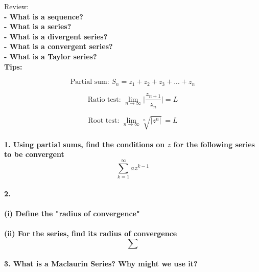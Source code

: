\documentclass{article}
\author{Alex Hiller}
\title{}
\newcommand{\begeq}[1]{\begin{equation} \label{eq:#1}}
\newcommand{\eeq}{\end{equation}}
\newcommand{\question}[1]{\textbf{#1} \\}   %
\begin{document}

Review: \\
\question{- What is a sequence?           \\
          - What is a series?             \\
          - What is a divergent series?   \\
          - What is a convergent series?  \\
          - What is a Taylor series?      }

\textbf{Tips:\\}

\begeq{partial_sum}
  \text{Partial sum: \ \ \ }
  S_n = z_1 + z_2 + z_3 + ... + z_n
\eeq 

\begeq{ratio_test}
  \text{Ratio test: \ \ \ }
  \lim_{n \rightarrow \infty} \bigg| \frac{z_{n+1}}{z_n}  \bigg| = L
\eeq

\begeq{root_test}
  \text{Root test: \ \ \ }
  \lim_{n \rightarrow \infty} \sqrt[n]{|z^n|} \ = L
\eeq \\


\question{1. Using partial sums, find the conditions on $z$ for the following series to be convergent}
\begeq{q2}
  \sum^{\infty}_{k=1} az^{k-1}
\eeq \\


\question{2.\\ }
\question{(i)  Define the "radius of convergence" \\ }
\question{(ii) For the series, find its radius of convergence}
  \begeq{rad_of_conv}
    \sum
  \eeq \\

\question{3. What is a Maclaurin Series? Why might we use it?}
\end{document}
